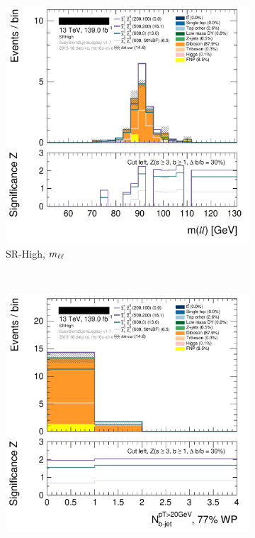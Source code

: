 \begin{figure}[tp]
\centering
\begin{subfigure}{0.62\textwidth}
\centering
\includegraphics[width=\textwidth]{figures/2ljets_region_design_hist1d_mll_SRHigh.png}
\caption{SR-High, $m_{\ell\ell}$}
\end{subfigure}
\\
\begin{subfigure}{0.62\textwidth}
\centering
\includegraphics[width=\textwidth]{figures/2ljets_region_design_hist1d_nbtag_SRHigh.png}

\end{subfigure}
\end{figure}
